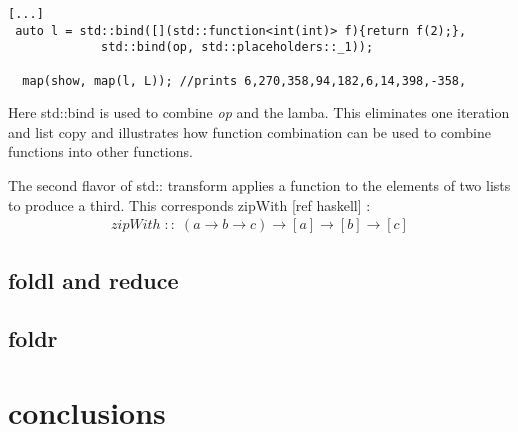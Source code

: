 \documentclass[12pt,fleqn]{article}
\begin{document}
 \begin{lstlisting}
[...]
 auto l = std::bind([](std::function<int(int)> f){return f(2);},
		     std::bind(op, std::placeholders::_1));

  map(show, map(l, L)); //prints 6,270,358,94,182,6,14,398,-358,

\end{lstlisting}

Here std::bind is used to combine {\em op} and the lamba. 
This eliminates one iteration and list copy and illustrates how function combination can be used to combine functions into other functions.

The second flavor of std:: transform applies a function to the elements of two lists to produce a third. 
This corresponds zipWith [ref haskell] :
\begin{eqnarray*}
zipWith \;::\; (a \rightarrow b \rightarrow c ) \rightarrow [a] \rightarrow [b] \rightarrow [c]
\end{eqnarray*}


\subsection*{foldl and reduce}

\subsection*{foldr}

\section*{conclusions}
\end{document}
